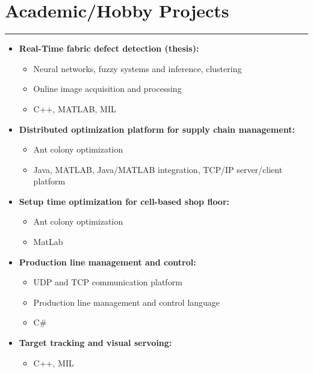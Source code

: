 \documentclass[a4paper,english]{article}
\newcommand{\topic}[1]{
\section*{#1} \vspace{-6mm}
\rule{\columnwidth}{.25mm}
}
\begin{document}
\topic{Academic/Hobby Projects}
\begin{itemize}
    \setlength{\itemsep}{-1mm}
    \item[] {\bf Real-Time fabric defect detection (thesis):}\\ \vspace{-7mm}
    \begin{itemize}
        \setlength{\itemsep}{-1mm}
        \item[] Neural networks, fuzzy systems and inference, clustering
        \item[] Online image acquisition and processing
        \item[] C++, MATLAB, MIL
    \end{itemize}

    \item[] {\bf Distributed optimization platform for supply chain management:}\\ \vspace{-7mm}
    \begin{itemize}
        \setlength{\itemsep}{-1mm}
        \item Ant colony optimization
        \item Java, MATLAB, Java/MATLAB integration, TCP/IP server/client platform
    \end{itemize}

    \item[] {\bf Setup time optimization for cell-based shop floor:}\\ \vspace{-7mm}
    \begin{itemize}
    \setlength{\itemsep}{-1mm}
        \item Ant colony optimization
        \item MatLab
    \end{itemize}

    \item[] {\bf Production line management and control:}\\ \vspace{-7mm}
    \begin{itemize}
    \setlength{\itemsep}{-1mm}
        \item UDP and TCP communication platform
        \item Production line management and control language
        \item C\#
    \end{itemize}

    \item[] {\bf Target tracking and visual servoing:}\\ \vspace{-7mm}
    \begin{itemize}
        \setlength{\itemsep}{-1mm}
        \item C++, MIL
    \end{itemize}


\end{itemize}
\end{document}
